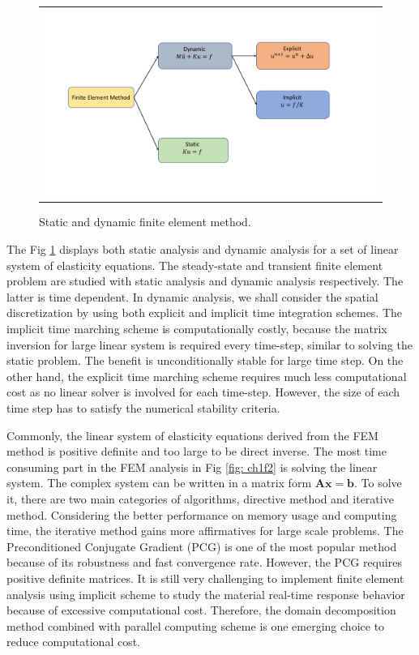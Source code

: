 \begin{figure}[H]
	\centering
	\begin{tabular}{c}
		\includegraphics[width=1.1\textwidth]{./pics/fem}
	\end{tabular}
	\caption{\footnotesize Static and dynamic finite element method.} \label{fig: ch1f3}
\end{figure}

The Fig \ref{fig: ch1f3} displays both static analysis and dynamic analysis for a set of linear system of elasticity equations. The steady-state and transient finite element problem are studied with static analysis and dynamic analysis respectively. The latter is time dependent. In dynamic analysis, we shall consider the spatial discretization by using both explicit and implicit time integration schemes\cite{bathe2008finite}. The implicit time marching scheme is computationally costly, because the matrix inversion for large linear system is required every time-step, similar to solving the static problem. The benefit is unconditionally stable for large time step. On the other hand, the explicit time marching scheme requires much less computational cost as no linear solver is involved for each time-step. However, the size of each time step has to satisfy the numerical stability criteria. 


Commonly, the linear system of elasticity equations derived from the FEM method is positive definite and too large to be direct inverse. The most time consuming part in the FEM analysis in Fig \ref{fig: ch1f2} is solving the linear system. The complex system can be written in a matrix form $ \mathbf{A} \mathbf{x} = \mathbf{b} $. To solve it, there are two main categories of algorithms, directive method and iterative method. Considering the better performance on memory usage and computing time, the iterative method gains more affirmatives\cite{brussino1989comparison} for large scale problems. The Preconditioned Conjugate Gradient (PCG) is one of the most popular method because of its robustness and fast convergence rate. However, the PCG requires positive definite matrices. It is still very challenging to implement finite element analysis using implicit scheme to study the material real-time response behavior because of excessive computational cost. Therefore, the domain decomposition method combined with parallel computing scheme is one emerging choice to reduce computational cost.

